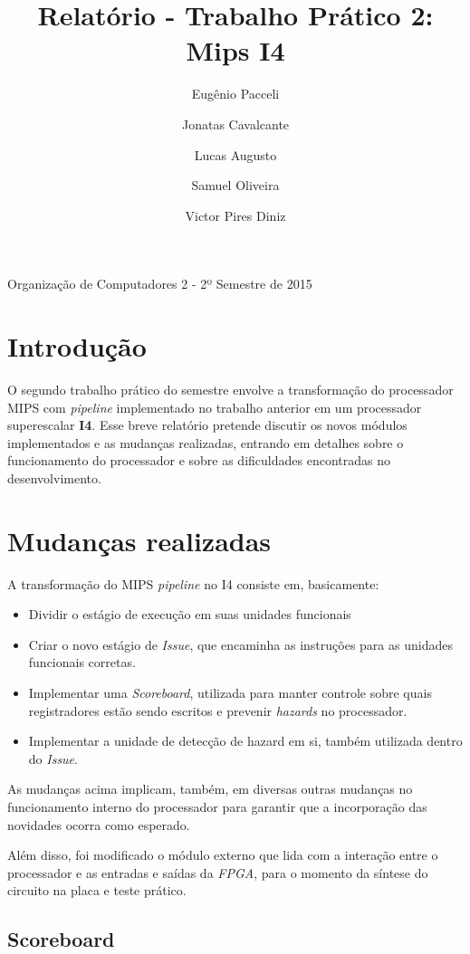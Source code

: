 \documentclass[12pt,a4paper]{article}
\title{Relatório - Trabalho Prático 2: Mips I4}
\author{
    Eugênio Pacceli
    \and
    Jonatas Cavalcante
    \and
    Lucas Augusto
    \and
    Samuel Oliveira
    \and
    Victor Pires Diniz
}
\numberwithin{equation}{section}
\begin{document}
\maketitle
\begin{center}
Organização de Computadores 2 - 2º Semestre de 2015
\end{center}

\section{Introdução}

O segundo trabalho prático do semestre envolve a transformação do processador MIPS com \emph{pipeline} implementado no trabalho anterior em um processador superescalar \textbf{I4}. Esse breve relatório pretende discutir os novos módulos implementados e as mudanças realizadas, entrando em detalhes sobre o funcionamento do processador e sobre as dificuldades encontradas no desenvolvimento.

\section{Mudanças realizadas}

A transformação do MIPS \emph{pipeline} no I4 consiste em, basicamente:

\begin{itemize}
    \item Dividir o estágio de execução em suas unidades funcionais
    \item Criar o novo estágio de \emph{Issue}, que encaminha as instruções para as unidades funcionais corretas.
    \item Implementar uma \emph{Scoreboard}, utilizada para manter controle sobre quais registradores estão sendo escritos e prevenir \emph{hazards} no processador.
    \item Implementar a unidade de detecção de hazard em si, também utilizada dentro do \emph{Issue}.
\end{itemize}

As mudanças acima implicam, também, em diversas outras mudanças no funcionamento interno do processador para garantir que a incorporação das novidades ocorra como esperado.

Além disso, foi modificado o módulo externo que lida com a interação entre o processador e as entradas e saídas da \emph{FPGA}, para o momento da síntese do circuito na placa e teste prático.

\subsection{Scoreboard}
\end{document}
